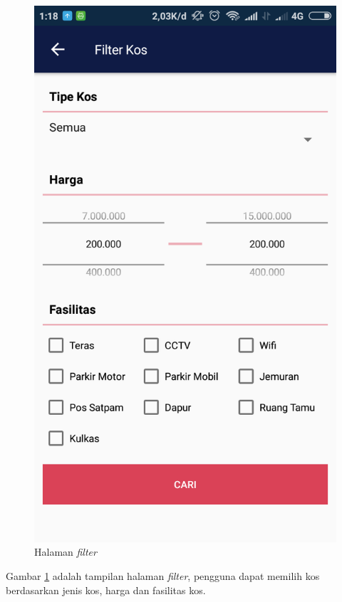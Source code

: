 		\begin{figure}[H]
			\centering
			\includegraphics[scale=0.25]{gambar/and/5}
			\caption{Halaman \textit{filter}}
			\label{and4}
		\end{figure}
	
		Gambar \ref{and4} adalah tampilan halaman \textit{filter}, pengguna dapat memilih kos berdasarkan jenis kos, harga dan fasilitas kos.
		
